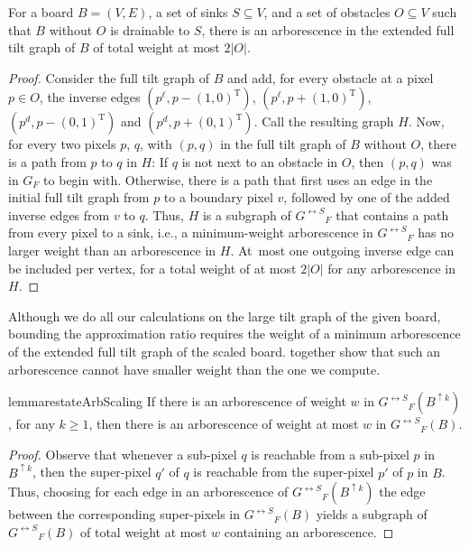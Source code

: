 \documentclass[a4paper,UKenglish,cleveref,thm-restate]{lipics-v2021}
\newcommand{\Tpose}{\ensuremath{\mathrm{T}}}
\newcommand{\bScale}[2][k]{\ensuremath{{#2}^{\uparrow {#1}}}}
\newcommand{\gExt}[1][G]{\ensuremath{{#1}^{\leftrightarrow S}}}
\begin{document}
\begin{lemma}\label{lem:obstacle-weight-bound}
For a board $B=(V,E)$, a set of sinks $S \subseteq V$, and a set of obstacles
$O \subseteq V$ such that $B$ without $O$ is drainable to $S$, there is an
arborescence in the extended full tilt graph of $B$ of total weight at most
$2|O|$.
\end{lemma}
\begin{proof}
Consider the full tilt graph of $B$ and add, for every obstacle at a pixel
$p \in O$, the inverse edges \((p^\ell, p-(1,0)^\Tpose)\), \((p^\ell,
p+(1,0)^\Tpose)\), \((p^d, p-(0,1)^\Tpose)\) and \((p^d, p+(0,1)^\Tpose)\).
Call the resulting graph $H$. Now, for every two pixels $p$, $q$, with $(p,q)$
in the full tilt graph of $B$ without $O$, there is a path from $p$ to $q$ in
$H$: If $q$ is not next to an obstacle in $O$, then $(p,q)$ was in $G_F$ to
begin with. Otherwise, there is a path that first uses an edge in the initial
full tilt graph from $p$ to a boundary pixel $v$, followed by one of the added
inverse edges from $v$ to $q$.  Thus, $H$ is a subgraph of $\gExt_F$ that
contains a path from every pixel to a sink, i.e., a minimum-weight arborescence
in $\gExt_F$ has no larger weight than an arborescence in $H$. At~most one
outgoing inverse edge can be included per vertex, for a total weight of at most
$2|O|$ for any arborescence in $H$.
\end{proof}

Although we do all our calculations on the large tilt graph of the given board,
bounding the approximation ratio requires the weight of a minimum arborescence
of the extended full tilt graph of the scaled board.
 together show that such an arborescence
cannot have smaller weight than the one we compute.

\begin{restatable}{lemma}{restateArbScaling}\label{lem:arb-scaling}
If there is an arborescence of weight $w$ in $\gExt_F(\bScale{B})$, for any
$k \geq 1$, then there is an arborescence of weight at most $w$ in $\gExt_F(B)$.
\end{restatable}
\begin{proof}
    Observe that whenever a sub-pixel $q$ is reachable from a sub-pixel $p$ in
    $\bScale{B}$, then the super-pixel $q'$ of $q$ is reachable from the super-pixel
    $p'$ of $p$ in $B$. Thus, choosing for each edge in an arborescence of
    $\gExt_F(\bScale{B})$ the edge between the corresponding super-pixels in
    $\gExt_F(B)$ yields a subgraph of $\gExt_F(B)$ of total weight at most $w$
    containing an arborescence.
\end{proof}
\end{document}
